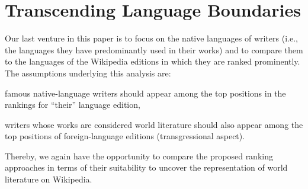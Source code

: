 \documentclass[a4paper,12pt]{scrartcl}
\begin{document}




\section{Transcending Language Boundaries}\label{sec:native-writers}


%
Our last venture in this paper is to focus on the native languages
of writers (i.e., the languages they
have predominantly used in their works) and to compare them to the
languages of the Wikipedia editions in which they are ranked
prominently.
%
%
%
The assumptions underlying this analysis are:%
\begin{inparaenum}[(a)]
\item famous native-language writers should appear among the top
  positions in the rankings for ``their'' language edition,
\item writers whose works are considered world literature should also
  appear among the top positions of foreign-language editions
  (transgressional aspect).
\end{inparaenum}
%
Thereby, we again have the opportunity to compare the
proposed ranking approaches in terms of their suitability to
uncover the representation of world literature on Wikipedia.

\end{document}
